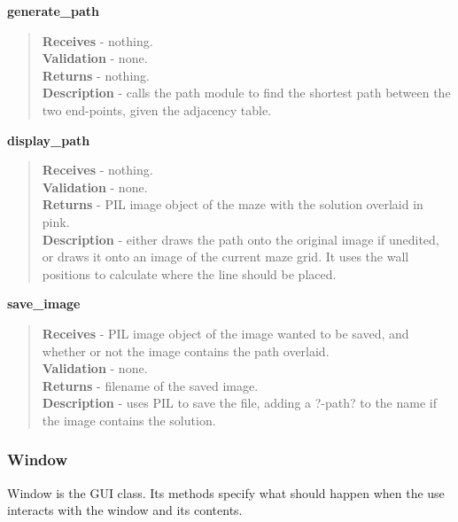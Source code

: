 \documentclass[titlepage]{article}
\begin{document}
\textbf{generate\_path}
\begin{quote}
\textbf{Receives} - nothing.
\\
\textbf{Validation} - none.\\
\textbf{Returns} - nothing.
\\
\textbf{Description} - calls the path module to find the shortest path between the two end-points, given the adjacency table.
\end{quote}

\textbf{display\_path}
\begin{quote}
\textbf{Receives} - nothing.
\\
\textbf{Validation} - none.\\
\textbf{Returns} - PIL image object of the maze with the solution overlaid in pink.
\\
\textbf{Description} - either draws the path onto the original image if unedited, or draws it onto an image of the current maze grid. It uses the wall positions to calculate where the line should be placed.
\end{quote}

\textbf{save\_image}
\begin{quote}
\textbf{Receives} - PIL image object of the image wanted to be saved, and whether or not the image contains the path overlaid.\\
\textbf{Validation} - none.\\
\textbf{Returns} - filename of the saved image.\\
\textbf{Description} - uses PIL to save the file, adding a ?-path? to the name if the image contains the solution.
\end{quote}

\subsubsection{Window}
Window is the GUI class. Its methods specify what should happen when the use interacts with the window and its contents.
\end{document}
